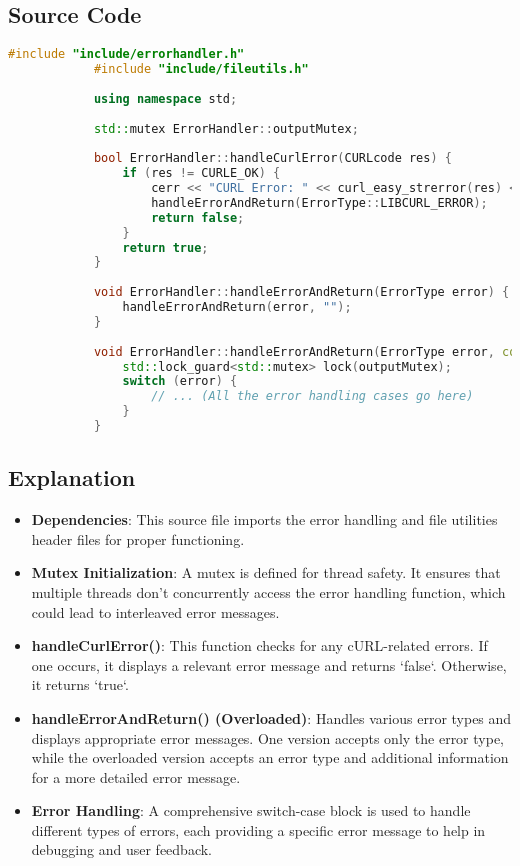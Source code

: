 \documentclass{article}
\begin{document}
	\subsection*{Source Code}
	\begin{mdframed}[backgroundcolor=background, hidealllines=false, innerleftmargin=15pt, innerrightmargin=5pt, innertopmargin=0pt, innerbottommargin=-5pt, linecolor=accent]
		\begin{lstlisting}[language=C++]
			#include "include/errorhandler.h"
			#include "include/fileutils.h"
			
			using namespace std;
			
			std::mutex ErrorHandler::outputMutex;
			
			bool ErrorHandler::handleCurlError(CURLcode res) {
				if (res != CURLE_OK) {
					cerr << "CURL Error: " << curl_easy_strerror(res) << endl;
					handleErrorAndReturn(ErrorType::LIBCURL_ERROR);
					return false;
				}
				return true;
			}
			
			void ErrorHandler::handleErrorAndReturn(ErrorType error) {
				handleErrorAndReturn(error, "");
			}
			
			void ErrorHandler::handleErrorAndReturn(ErrorType error, const string& extraInfo) {
				std::lock_guard<std::mutex> lock(outputMutex);
				switch (error) {
					// ... (All the error handling cases go here)
				}
			}
		\end{lstlisting}
	\end{mdframed}
	
	\subsection*{Explanation}
	\begin{itemize}
		\item \textbf{Dependencies}: This source file imports the error handling and file utilities header files for proper functioning.
		
		\item \textbf{Mutex Initialization}: A mutex is defined for thread safety. It ensures that multiple threads don't concurrently access the error handling function, which could lead to interleaved error messages.
		
		\item \textbf{handleCurlError()}: This function checks for any cURL-related errors. If one occurs, it displays a relevant error message and returns `false`. Otherwise, it returns `true`.
		
		\item \textbf{handleErrorAndReturn() (Overloaded)}: Handles various error types and displays appropriate error messages. One version accepts only the error type, while the overloaded version accepts an error type and additional information for a more detailed error message.
		
		\item \textbf{Error Handling}: A comprehensive switch-case block is used to handle different types of errors, each providing a specific error message to help in debugging and user feedback.
	\end{itemize}
		
\end{document}
